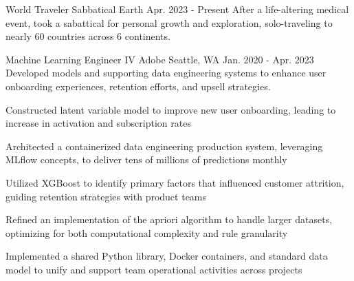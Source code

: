 
%
% 
% 
%
%
%
%
%
% 

\begin{cventries}

\cventry
    {World Traveler} %
    {Sabbatical} %
    {Earth} %
    {Apr. 2023 - Present} %
    {After a life-altering medical event, took a sabattical for personal growth and exploration, solo-traveling to nearly 60 countries across 6 continents.} %
    {}

\cventry
    {Machine Learning Engineer IV} %
    {Adobe} %
    {Seattle, WA} %
    {Jan. 2020 - Apr. 2023} %
    {Developed models and supporting data engineering systems to enhance user onboarding experiences, retention efforts, and upsell strategies.} %
    {
      \begin{cvitems} %
        \item {Constructed latent variable model to improve new user onboarding, leading to increase in activation and subscription rates}
        \item {Architected a containerized data engineering production system, leveraging MLflow concepts, to deliver tens of millions of predictions monthly}
        \item {Utilized XGBoost to identify primary factors that influenced customer attrition, guiding retention strategies with product teams}
        \item {Refined an implementation of the apriori algorithm to handle larger datasets, optimizing for both computational complexity and rule granularity}
        \item {Implemented a shared Python library, Docker containers, and standard data model to unify and support team operational activities across projects}
      \end{cvitems}
    }


\end{cventries}
